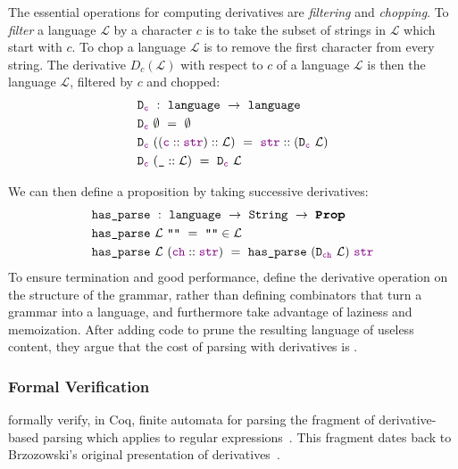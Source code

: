     The essential operations for computing derivatives are \emph{filtering} and \emph{chopping}.  To \emph{filter} a language $\mathcal L$ by a character $c$ is to take the subset of strings in $\mathcal L$ which start with $c$.  To chop a language $\mathcal L$ is to remove the first character from every string.  The derivative $D_c(\mathcal L)$ with respect to $c$ of a language $\mathcal L$ is then the language $\mathcal L$, filtered by $c$ and chopped:
\begin{align*}
&\texttt{D}_{\textcolor{violet}{\texttt{c}}}~:~\texttt{language}~\to~\texttt{language} \\
&\texttt{D}_{\textcolor{violet}{\texttt{c}}}~\emptyset~=~\emptyset \\
&\texttt{D}_{\textcolor{violet}{\texttt{c}}}~((\textcolor{violet}{\texttt{c}}::\textcolor{violet}{\texttt{str}})::\mathcal L)~=~\textcolor{violet}{\texttt{str}}::(\texttt{D}_{\textcolor{violet}{\texttt{c}}}~\mathcal{L}) \\
&\texttt{D}_{\textcolor{violet}{\texttt{c}}}~(\texttt{\_}::\mathcal L)~=~\texttt{D}_{\textcolor{violet}{\texttt{c}}}~\mathcal{L}
\end{align*}

      We can then define a  proposition by taking successive derivatives:
\begin{align*}
&\fname{has\_parse}~:~\coqtype{language}~\to~\coqtype{String}~\to~\Prop \\
&\fname{has\_parse}~\mathcal{L}~\str{}~=~\str{}\in\mathcal{L} \\
&\fname{has\_parse}~\mathcal{L}~(\cons{\farg{ch}}{\farg{str}})~=~\fname{has\_parse}~(\fname{D\ensuremath{_{\farg{ch}}}}~\mathcal L)~\farg{str}
\end{align*}
      To ensure termination and good performance, \citeauthor*{Derivs} define the derivative operation on the structure of the grammar, rather than defining combinators that turn a grammar into a language, and furthermore take advantage of laziness and memoization.  After adding code to prune the resulting language of useless content, they argue that the cost of parsing with derivatives is .
      
    \subsubsection{Formal Verification}
       formally verify, in Coq, finite automata for parsing the fragment of derivative-based parsing which applies to regular expressions~\cite{DerivsCoq}.  This fragment dates back to Brzozowski's original presentation of derivatives~\cite{BrzozowskiDerivs}.
  

